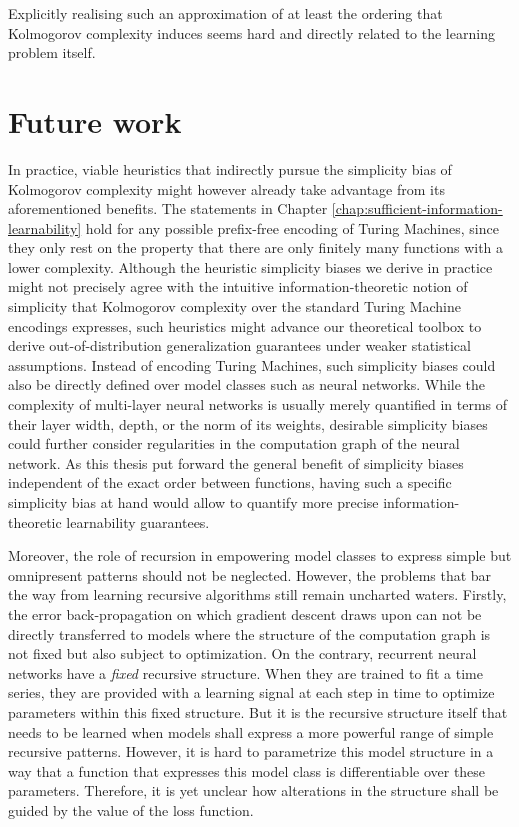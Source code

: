 Explicitly realising such an approximation of at least the ordering that Kolmogorov complexity induces seems hard and directly related to the learning problem itself. 

\section{Future work}
In practice, viable heuristics that indirectly pursue the simplicity bias of Kolmogorov complexity might however already take advantage from its aforementioned benefits.
The statements in Chapter \ref{chap:sufficient-information-learnability} hold for any possible prefix-free encoding of Turing Machines, since they only rest on the property that there are only finitely many functions with a lower complexity.
Although the heuristic simplicity biases we derive in practice might not precisely agree with the intuitive information-theoretic notion of simplicity that Kolmogorov complexity over the standard Turing Machine encodings expresses, such heuristics might advance our theoretical toolbox to derive out-of-distribution generalization guarantees under weaker statistical assumptions.
Instead of encoding Turing Machines, such simplicity biases could also be directly defined over model classes such as neural networks.
While the complexity of multi-layer neural networks is usually merely quantified in terms of their layer width, depth, or the norm of its weights, desirable simplicity biases could further consider regularities in the computation graph of the neural network.
As this thesis put forward the general benefit of simplicity biases independent of the exact order between functions, having such a specific simplicity bias at hand would allow to quantify more precise information-theoretic learnability guarantees.

Moreover, the role of recursion in empowering model classes to express simple but omnipresent patterns should not be neglected.
However, the problems that bar the way from learning recursive algorithms still remain uncharted waters.
Firstly, the error back-propagation on which gradient descent draws upon can not be directly transferred to models where the structure of the computation graph is not fixed but also subject to optimization.
On the contrary, recurrent neural networks have a \textit{fixed} recursive structure. When they are trained to fit a time series, they are provided with a learning signal at each step in time to optimize parameters within this fixed structure.
But it is the recursive structure itself that needs to be learned when models shall express a more powerful range of simple recursive patterns.
However, it is hard to parametrize this model structure in a way that a function that expresses this model class is differentiable over these parameters.
Therefore, it is yet unclear how alterations in the structure shall be guided by the value of the loss function. 

